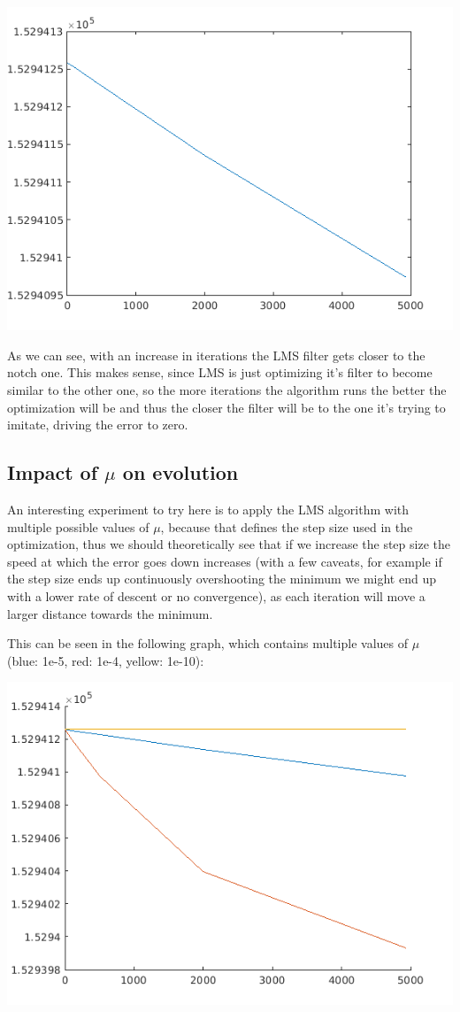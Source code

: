 \documentclass[conference,9pt]{IEEEtran}
\begin{document}
\includegraphics[scale=0.6]{error-evolution.png}

As we can see, with an increase in iterations the LMS filter gets closer to the notch one. This makes sense, since LMS is just optimizing it's filter to become similar to the other one, so the more iterations the algorithm runs the better the optimization will be and thus the closer the filter will be to the one it's trying to imitate, driving the error to zero.

\subsection{Impact of $\mu$ on evolution}
An interesting experiment to try here is to apply the LMS algorithm with multiple possible values of $\mu$, because that defines the step size used in the optimization, thus we should theoretically see that if we increase the step size the speed at which the error goes down increases (with a few caveats, for example if the step size ends up continuously overshooting the minimum we might end up with a lower rate of descent or no convergence), as each iteration will move a larger distance towards the minimum.

This can be seen in the following graph, which contains multiple values of $\mu$ (blue: 1e-5, red: 1e-4, yellow: 1e-10):

\includegraphics[scale=0.6]{mus.png}
\end{document}
